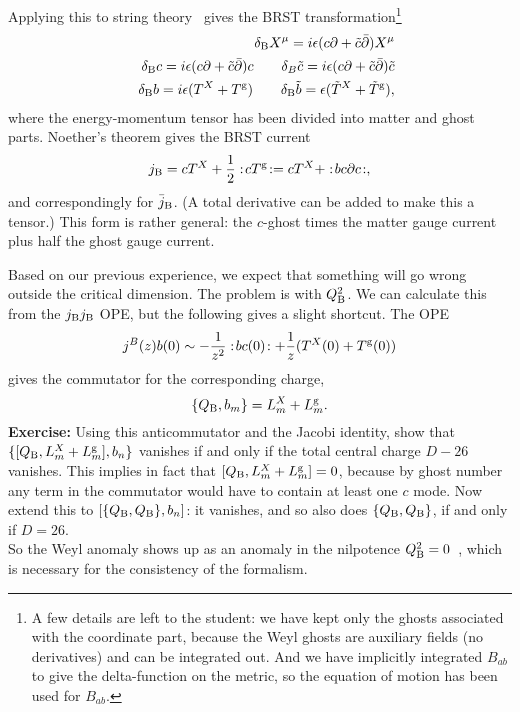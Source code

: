 Applying this to string theory~\cite{KO} gives the BRST
transformation\footnote {A few details are left to the student: we
have kept only the ghosts associated with the coordinate part,
because the Weyl ghosts are auxiliary fields (no derivatives) and
can be integrated out.  And we have implicitly integrated $B_{ab}$
to give the delta-function on the metric, so the equation of motion
has been used for $B_{ab}$.}
\begin{eqnarray}
&&\delta_{\rm B} X^\mu = i\epsilon (c\partial + \tilde c 
\bar\partial) X^\mu
\nonumber\\
&&\delta_{\rm B} c = i\epsilon (c\partial + \tilde c \bar\partial) c
\qquad
\delta_B \tilde c = i\epsilon (c\partial + \tilde c \bar\partial)
\tilde c
\nonumber\\
&&\delta_{\rm B} b =  i\epsilon(T^X + T^{\rm g})\qquad
\delta_{\rm B} \tilde b =  \epsilon(\tilde T^X + \tilde
T^{\rm g}), \label{bzt}
\end{eqnarray}
where the energy-momentum tensor has been divided into matter and
ghost parts.  Noether's theorem gives the BRST current
\begin{equation}
j_{\rm B} = cT^{ X} + \frac{1}{2} :\! cT^{\rm g}\! : 
= cT^{ X} + :\! b c \partial c \!: , \label{brsj}
\end{equation}
and correspondingly for $\bar j_{\rm B}$.  (A total derivative can
be added to make this a tensor.)  This form is rather general: the
$c$-ghost times the matter gauge current plus half the ghost gauge
current.

Based on our previous experience, we expect that something will go
wrong outside the critical dimension.  The problem is with $Q_{\rm
B}^2$.  We can calculate this from the $j_{\rm B} j_{\rm B}$ OPE, but
the following  gives a slight shortcut.  The OPE
\begin{equation}
j^{B}(z)b(0) \sim
-\frac{1}{z^2} :\! bc(0) \!:  + \frac{1}{z}
( T^{X}(0) + T^{\rm g}(0) ) \label{jbb}
\end{equation}
gives the commutator for the corresponding charge,
\begin{equation}
\{Q_{\rm B}, b_m \} = L^{X}_m + L^{\rm g}_m.
\end{equation}
{\bf Exercise:}  Using this anticommutator and the Jacobi
identity, show that
$\{ [ Q_{\rm B}, 
L^{X}_m + L^{\rm g}_m ], b_n \}$ vanishes if and only if the
total central charge $D - 26$ vanishes.  This implies in fact that
$[ Q_{\rm B}, 
L^{X}_m + L^{\rm g}_m ]=0$, because by ghost number any term in
the commutator would have to contain at least one $c$ mode.  Now
extend this to $[ \{ Q_{\rm B}, Q_{\rm B} \}, b_n ]$: it vanishes,
and so also does
$\{ Q_{\rm B}, Q_{\rm B} \}$, if and only if $D=26$.\\[3pt]
So the Weyl
anomaly shows up as an anomaly in the nilpotence $Q_{\rm B}^2 =
0$~\cite{KO}, which is necessary for the consistency of the
formalism.

